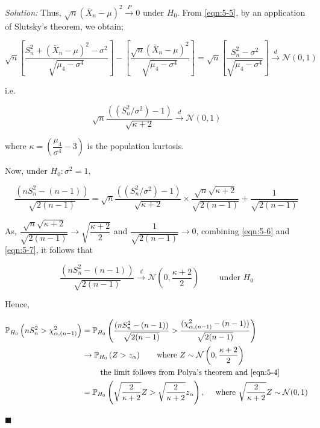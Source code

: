 \documentclass[12pt]{article}
\newcommand{\prob}{\mathbb{P}}
\newcommand{\normal}{\mathcal{N}}
\theoremstyle{definition}
\newenvironment{answer}{\textit{Solution: }\quad }{ \hfill $\blacksquare$}
\numberwithin{equation}{section}
\begin{document}
\begin{answer}
    Thus, $\sqrt{n}(\bar{X}_n - \mu)^2 \xrightarrow{P} 0$ under $H_0$. From \cref{eqn:5-5}, by an application of Slutsky's theorem, we obtain;

    \begin{equation*}
         \sqrt{n}  \left[\dfrac{S_n^2 + (\bar{X}_n - \mu)^2 - \sigma^2}{\sqrt{\mu_4 - \sigma^4}}\right] - \left[\dfrac{\sqrt{n}(\bar{X}_n - \mu)^2}{\sqrt{\mu_4 - \sigma^4}}\right]
         = \sqrt{n}  \left[\dfrac{S_n^2 - \sigma^2}{\sqrt{\mu_4 - \sigma^4}}\right] \xrightarrow{d} \normal(0, 1)
    \end{equation*}

    i.e.

    \begin{equation}
        \sqrt{n} \dfrac{\left((S_n^2/\sigma^2) - 1\right)}{\sqrt{\kappa + 2}} \xrightarrow{d} \normal(0, 1)
        \label{eqn:5-6}
    \end{equation}

    where $\kappa = \left(\dfrac{\mu_4}{\sigma^4} - 3\right)$ is the population kurtosis.

    Now, under $H_0: \sigma^2 = 1$, 

    \begin{equation}
        \dfrac{(nS_n^2 - (n-1))}{\sqrt{2(n-1)}}
        = \sqrt{n} \dfrac{\left( (S_n^2/\sigma^2)  - 1\right)}{\sqrt{\kappa + 2}} \times \dfrac{\sqrt{n}\sqrt{\kappa + 2}}{\sqrt{2(n-1)}} + \dfrac{1}{\sqrt{2(n-1)}}
        \label{eqn:5-7}
    \end{equation}

    As, $\dfrac{\sqrt{n}\sqrt{\kappa + 2}}{\sqrt{2(n-1)}} \rightarrow \sqrt{\dfrac{\kappa + 2}{2}}$ and $\dfrac{1}{\sqrt{2(n-1)}} \rightarrow 0$, combining \cref{eqn:5-6} and \cref{eqn:5-7}, it follows that 

    \begin{equation}
        \dfrac{(nS_n^2 - (n-1))}{\sqrt{2(n-1)}} \xrightarrow{d} \normal\left( 0, \dfrac{\kappa + 2}{2} \right)
        \qquad \text{ under } H_0
        \label{eqn:5-8}
    \end{equation}

    Hence,

    \begin{align*}
        \prob_{H_0}\left( nS_n^2 > \chi^2_{\alpha, (n-1)} \right)
        & = \prob_{H_0} \left( \dfrac{(nS_n^2 - (n-1))}{\sqrt{2(n-1)}} > \dfrac{(\chi^2_{\alpha, (n-1)} - (n-1))}{\sqrt{2(n-1)}} \right)\\
        & \rightarrow \prob_{H_0}\left( Z > z_\alpha \right)
        \qquad \text{where } Z \sim \normal\left( 0, \dfrac{\kappa + 2}{2} \right)\\
        & \qquad \text{ the limit follows from Polya’s theorem and \cref{eqn:5-4}}\\
        & = \prob_{H_0} \left( \sqrt{\dfrac{2}{\kappa + 2}}Z > \sqrt{\dfrac{2}{\kappa + 2}} z_\alpha \right), \quad \text{ where } \sqrt{\dfrac{2}{\kappa + 2}}Z \sim \normal(0, 1)
    \end{align*}


\end{answer}
\end{document}
